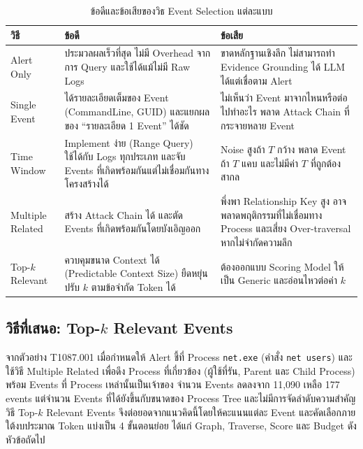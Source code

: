\begin{table}[htbp]
  \centering
  \caption{ข้อดีและข้อเสียของวิธ Event Selection แต่ละแบบ}
  \label{tab:es-methods}
  \begin{tabular}{|L{0.16\textwidth}|L{0.36\textwidth}|L{0.36\textwidth}|}
    \hline
    \textbf{วิธี} & \textbf{ข้อดี} & \textbf{ข้อเสีย} \\ \hline
    Alert Only &
      ประมวลผลเร็วที่สุด ไม่มี Overhead จากการ Query และใช้ได้แม้ไม่มี Raw Logs &
      ขาดหลักฐานเชิงลึก ไม่สามารถทำ Evidence Grounding ได้ LLM ได้แต่เชื่อตาม Alert \\ \hline
    Single Event &
      ได้รายละเอียดเต็มของ Event (CommandLine, GUID) และแยกผลของ ``รายละเอียด 1 Event'' ได้ชัด &
      ไม่เห็นว่า Event มาจากไหนหรือต่อไปทำอะไร พลาด Attack Chain ที่กระจายหลาย Event \\ \hline
    Time Window &
      Implement ง่าย (Range Query) ใช้ได้กับ Logs ทุกประเภท และจับ Events ที่เกิดพร้อมกันแต่ไม่เชื่อมกันทางโครงสร้างได้ &
      Noise สูงถ้า $T$ กว้าง พลาด Event ถ้า $T$ แคบ และไม่มีค่า $T$ ที่ถูกต้องสากล \\ \hline
    Multiple Related &
      สร้าง Attack Chain ได้ และตัด Events ที่เกิดพร้อมกันโดยบังเอิญออก &
      พึ่งพา Relationship Key สูง อาจพลาดพฤติกรรมที่ไม่เชื่อมทาง Process และเสี่ยง Over-traversal หากไม่จำกัดความลึก \\ \hline
    Top-$k$ Relevant &
      ควบคุมขนาด Context ได้ (Predictable Context Size) ยืดหยุ่น ปรับ $k$ ตามข้อจำกัด Token ได้ &
      ต้องออกแบบ Scoring Model ให้เป็น Generic และอ่อนไหวต่อค่า $k$ \\ \hline
  \end{tabular}
\end{table}

\FloatBarrier

\subsection{วิธีที่เสนอ: Top-$k$ Relevant Events}
จากตัวอย่าง T1087.001 เมื่อกำหนดให้ Alert ชี้ที่ Process \texttt{net.exe} (คำสั่ง \texttt{net users})
และใช้วิธี Multiple Related เพื่อดึง Process ที่เกี่ยวข้อง (ผู้ใช้ที่รัน, Parent และ Child Process)
พร้อม Events ที่ Process เหล่านั้นเป็นเจ้าของ จำนวน Events ลดลงจาก 11,090 เหลือ 177 events
แต่จำนวน Events ที่ได้ยังขึ้นกับขนาดของ Process Tree และไม่มีการจัดลำดับความสำคัญ
วิธี Top-$k$ Relevant Events จึงต่อยอดจากแนวคิดนี้โดยให้คะแนนแต่ละ Event และคัดเลือกภายใต้งบประมาณ Token
แบ่งเป็น 4 ขั้นตอนย่อย ได้แก่ Graph, Traverse, Score และ Budget ดังหัวข้อถัดไป

